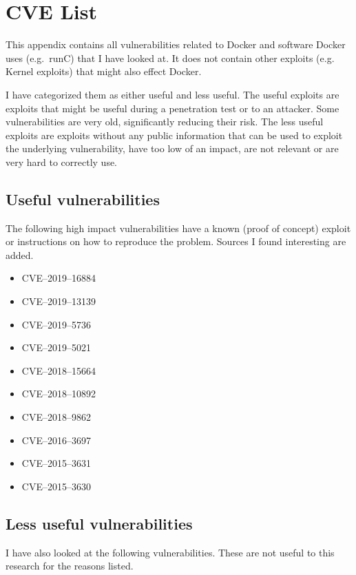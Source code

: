 \chapter{CVE List}\label{appendix:CVE-List}

This appendix contains all vulnerabilities related to Docker and software Docker uses (e.g.\ runC) that I have looked at. It does not contain other exploits (e.g. Kernel exploits) that might also effect Docker.

I have categorized them as either useful and less useful. The useful exploits are exploits that might be useful during a penetration test or to an attacker. Some vulnerabilities are very old, significantly reducing their risk. The less useful exploits are exploits without any public information that can be used to exploit the underlying vulnerability, have too low of an impact, are not relevant or are very hard to correctly use.

\section{Useful vulnerabilities}
The following high impact vulnerabilities have a known (proof of concept) exploit or instructions on how to reproduce the problem. Sources I found interesting are added.

\begin{itemize}
    \item CVE--2019--16884\cite{CVE-2019-16884-Github}
    \item CVE--2019--13139\cite{CVE-2019-13139-STAALDRAAD}
    \item CVE--2019--5736\cite{CVE-2019-5736-DragonSector}\cite{CVE-2019-5736-Github}\cite{CVE-2019-5736-Twistlock}
    \item CVE--2019--5021\cite{CVE-2019-5021-Talos}
    \item CVE--2018--15664\cite{CVE-2018-15664-Openwall}\cite{CVE-2018-15664-Bugzilla}
    \item CVE--2018--10892\cite{CVE-2018-10892-Github}
    \item CVE--2018--9862\cite{CVE-2018-9862-Github}
    \item CVE--2016--3697\cite{CVE-2016-3697-Github}
    \item CVE--2015--3631\cite{CVE-2015-363-Seclists}
    \item CVE--2015--3630\cite{CVE-2015-363-Seclists}
\end{itemize}

\section{Less useful vulnerabilities}
I have also looked at the following vulnerabilities. These are not useful to this research for the reasons listed.

